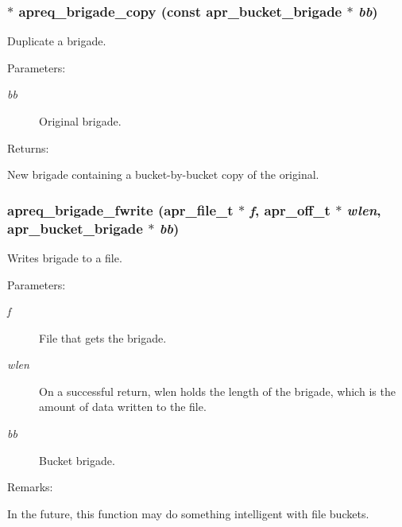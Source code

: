 \subsubsection{$\ast$ apreq\_\-brigade\_\-copy (const {\bf apr\_\-bucket\_\-brigade} $\ast$ {\em bb})}\label{group__Utils_a22}


Duplicate a brigade. \begin{Desc}
\item[Parameters: ]\par
\begin{description}
\item[{\em 
bb}]Original brigade. \end{description}
\end{Desc}
\begin{Desc}
\item[Returns: ]\par
New brigade containing a bucket-by-bucket copy of the original. \end{Desc}
\subsubsection{ apreq\_\-brigade\_\-fwrite ({\bf apr\_\-file\_\-t} $\ast$ {\em f}, {\bf apr\_\-off\_\-t} $\ast$ {\em wlen}, {\bf apr\_\-bucket\_\-brigade} $\ast$ {\em bb})}\label{group__Utils_a19}


Writes brigade to a file. \begin{Desc}
\item[Parameters: ]\par
\begin{description}
\item[{\em 
f}]File that gets the brigade. \item[{\em 
wlen}]On a successful return, wlen holds the length of the brigade, which is the amount of data written to  the file. \item[{\em 
bb}]Bucket brigade. \end{description}
\end{Desc}
\begin{Desc}
\item[Remarks: ]\par
In the future, this function may do something  intelligent with file buckets. \end{Desc}
